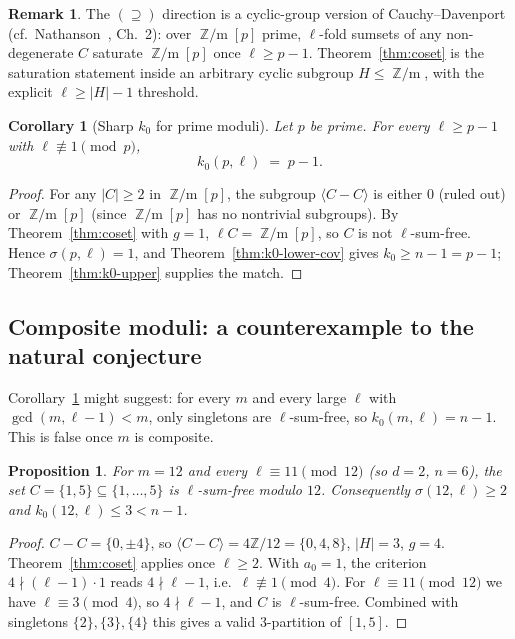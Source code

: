 \documentclass[11pt]{amsart}
\theoremstyle{plain}
\newtheorem{proposition}[theorem]{Proposition}
\newtheorem{corollary}[theorem]{Corollary}
\theoremstyle{definition}
\newtheorem{remark}[theorem]{Remark}
\DeclareMathOperator{\Zm}{\mathbb{Z}/m}
\begin{document}
\begin{remark}
The $(\supseteq)$ direction is a cyclic-group version of Cauchy--Davenport (cf.\ Nathanson~\cite{Nathanson1996}, Ch.~2): over $\Zm[p]$ prime, $\ell$-fold sumsets of any non-degenerate $C$ saturate $\Zm[p]$ once $\ell\ge p-1$. Theorem~\ref{thm:coset} is the saturation statement inside an arbitrary cyclic subgroup $H\le\Zm$, with the explicit $\ell\ge|H|-1$ threshold.
\end{remark}

\begin{corollary}[Sharp $k_0$ for prime moduli]\label{cor:prime-sharp}
Let $p$ be prime. For every $\ell\ge p-1$ with $\ell\not\equiv 1\pmod p$,
\[
k_0(p,\ell) \;=\; p - 1.
\]
\end{corollary}
\begin{proof}
For any $|C|\ge 2$ in $\Zm[p]$, the subgroup $\langle C-C\rangle$ is either $0$ (ruled out) or $\Zm[p]$ (since $\Zm[p]$ has no nontrivial subgroups). By Theorem~\ref{thm:coset} with $g=1$, $\ell C = \Zm[p]$, so $C$ is not $\ell$-sum-free. Hence $\sigma(p,\ell) = 1$, and Theorem~\ref{thm:k0-lower-cov} gives $k_0\ge n-1 = p-1$; Theorem~\ref{thm:k0-upper} supplies the match.
\end{proof}

\subsection{Composite moduli: a counterexample to the natural conjecture}

Corollary~\ref{cor:prime-sharp} might suggest: for every $m$ and every large $\ell$ with $\gcd(m,\ell-1)<m$, only singletons are $\ell$-sum-free, so $k_0(m,\ell) = n-1$. This is false once $m$ is composite.

\begin{proposition}\label{prop:refute-A}
For $m=12$ and every $\ell\equiv 11\pmod{12}$ (so $d=2$, $n=6$), the set $C = \{1,5\}\subseteq\{1,\ldots,5\}$ is $\ell$-sum-free modulo $12$. Consequently $\sigma(12,\ell)\ge 2$ and $k_0(12,\ell)\le 3 < n-1$.
\end{proposition}
\begin{proof}
$C-C = \{0,\pm 4\}$, so $\langle C-C\rangle = 4\mathbb{Z}/12 = \{0,4,8\}$, $|H|=3$, $g=4$. Theorem~\ref{thm:coset} applies once $\ell\ge 2$. With $a_0=1$, the criterion $4\nmid(\ell-1)\cdot 1$ reads $4\nmid\ell-1$, i.e.\ $\ell\not\equiv 1\pmod 4$. For $\ell\equiv 11\pmod{12}$ we have $\ell\equiv 3\pmod 4$, so $4\nmid\ell-1$, and $C$ is $\ell$-sum-free. Combined with singletons $\{2\},\{3\},\{4\}$ this gives a valid $3$-partition of $[1,5]$.
\end{proof}
\end{document}
